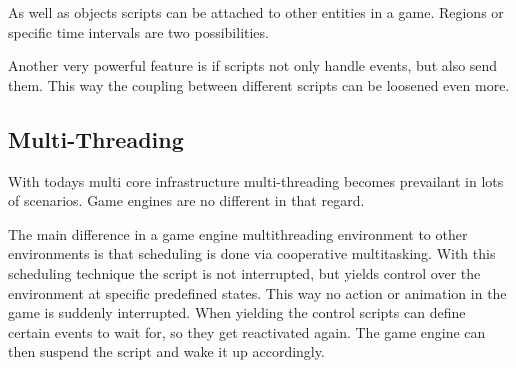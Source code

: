 \documentclass{article}
\begin{document}
As well as objects scripts can be attached to other entities in a game. Regions
or specific time intervals are two possibilities.

Another very powerful feature is if scripts not only handle events, but also
send them. This way the coupling between different scripts can be loosened
even more.

\subsection{Multi-Threading}
With todays multi core infrastructure multi-threading becomes prevailant in lots of
scenarios. Game engines are no different in that regard.

The main difference in a game engine multithreading environment to other environments
is that scheduling is done via cooperative multitasking. With this scheduling
technique the script is not interrupted, but yields control over the environment
at specific predefined states. This way no action or animation in the game is suddenly
interrupted.
When yielding the control scripts can define certain events to wait for, so they
get reactivated again. The game engine can then suspend the script and wake it up
accordingly.




\end{document}

